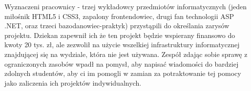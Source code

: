\documentclass[a4paper, 12pt]{article}
\begin{document}
Wyznaczeni pracownicy - trzej wykładowcy przedmiotów informatycznych (jeden miłośnik HTML5 i CSS3, zapalony frontendowiec, drugi fan technologii ASP .NET, oraz trzeci bazodanowiec-praktyk) przystąpili do określania zarysów projektu. Dziekan zapewnił ich że ten projekt będzie wspierany finansowo do kwoty 20 tys. zł, ale zezwolił na użycie wszelkiej infrastruktury informatycznej znajdującej się na wydziale, która nie jest używana. Zespół zdając sobie sprawę z ograniczonych zasobów wpadł na pomysł, aby napisać wiadomości do bardziej zdolnych studentów, aby ci im pomogli w zamian za potraktowanie tej pomocy jako zaliczenia ich projektów indywidualnych.
\end{document}
